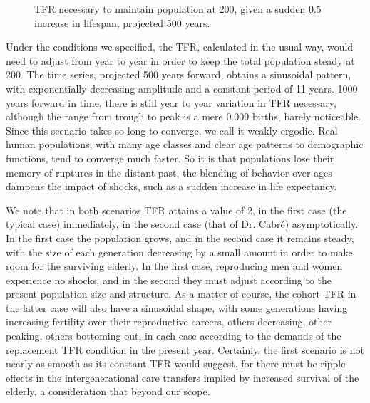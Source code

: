 \documentclass[reqno,12pt,oneside,a4paper]{report} %
\theoremstyle{plain}
\theoremstyle{definition}
\theoremstyle{remark}
\numberwithin{theorem}{chapter}     %
\begin{document}
\begin{figure}
\begin{center}


{\tikzexternaldisable

}
\end{center}
\caption{TFR necessary to maintain population at 200, given a sudden 0.5 increase in lifespan, projected 500 years.}
\label{fig:one}
\end{figure}

Under the conditions we specified, the TFR, calculated in the usual way, would need to adjust from year to year in order to keep the total population steady at 200. The time series, projected 500 years forward, obtains a sinusoidal pattern, with exponentially decreasing amplitude and a constant period of 11 years. 1000 years forward in time, there is still year to year variation in TFR necessary, although the range from trough to peak is a mere 0.009 births, barely noticeable. Since this scenario takes so long to converge, we call it weakly ergodic. Real human populations, with many age classes and clear age patterns to demographic functions, tend to converge much faster. So it is that populations lose their memory of ruptures in the distant past, the blending of behavior over ages dampens the impact of shocks, such as a sudden increase in life expectancy.

We note that in both scenarios TFR attains a value of 2, in the first case (the typical case) immediately, in the second case (that of Dr. Cabr\'{e}) asymptotically. In the first case the population grows, and in the second case it remains steady, with the size of each generation decreasing by a small amount in order to make room for the surviving elderly. In the first case, reproducing men and women experience no shocks, and in the second they must adjust according to the present population size and structure. As a matter of course, the cohort TFR in the latter case will also have a sinusoidal shape, with some generations having increasing fertility over their reproductive careers, others decreasing, other peaking, others bottoming out, in each case according to the demands of the replacement TFR condition in the present year. Certainly, the first scenario is not nearly as smooth as its constant TFR would suggest, for there must be ripple effects in the intergenerational care transfers implied by increased survival of the elderly, a consideration that beyond our scope.
\end{document}
